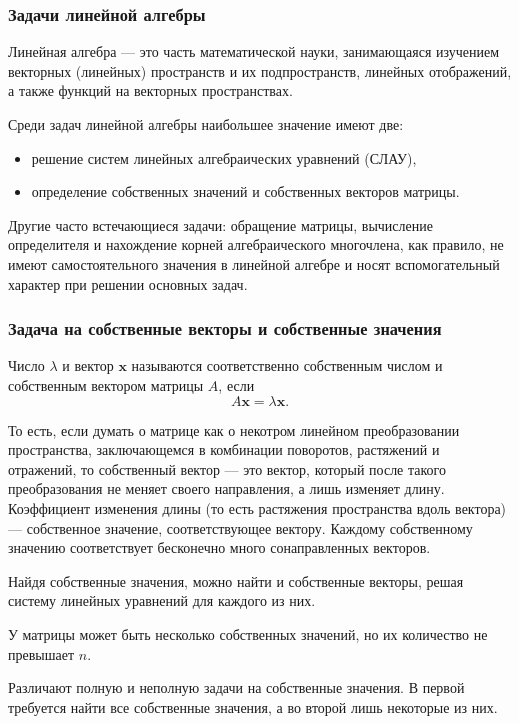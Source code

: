 \subsubsection{Задачи линейной алгебры}

Линейная алгебра — это часть математической науки, занимающаяся изучением
векторных (линейных) пространств и их подпространств, линейных отображений,
а также функций на векторных пространствах.

Среди задач линейной алгебры наибольшее значение имеют две:
\begin{itemize}
\item решение систем линейных алгебраических уравнений (СЛАУ),
\item определение собственных значений и собственных векторов матрицы.
\end{itemize}
Другие часто встечающиеся задачи: обращение матрицы, вычисление определителя
и нахождение корней алгебраического многочлена, как правило, не имеют
самостоятельного значения в линейной алгебре и носят вспомогательный
характер при решении основных задач.


\subsubsection{Задача на собственные векторы и собственные значения}

Число $\lambda$ и вектор $\mathbf{x}$ называются соответственно
собственным числом и собственным вектором матрицы $A$, если
\[
A\mathbf{x}=\lambda\mathbf{x}.
\]


То есть, если думать о матрице как о некотром линейном преобразовании
пространства, заключающемся в комбинации поворотов, растяжений и отражений,
то собственный вектор — это вектор, который после такого преобразования
не меняет своего направления, а лишь изменяет длину. Коэффициент изменения
длины (то есть растяжения пространства вдоль вектора) — собственное
значение, соответствующее вектору. Каждому собственному значению соответствует
бесконечно много сонаправленных векторов.

Найдя собственные значения, можно найти и собственные векторы, решая
систему линейных уравнений для каждого из них.

У матрицы может быть несколько собственных значений, но их количество
не превышает $n$.

Различают полную и неполную задачи на собственные значения. В первой
требуется найти все собственные значения, а во второй лишь некоторые
из них.

